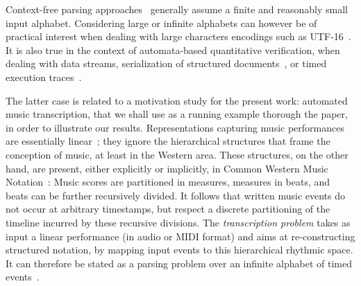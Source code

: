 
Context-free parsing approaches~\cite{GruneJacobs08parsing}
generally assume a finite and reasonably small input alphabet. %
Considering large or infinite alphabets can however be of
practical interest when dealing with large characters encodings such as UTF-16~\cite{dAntoni21CACM}.
It is also true in the context of automata-based quantitative verification,  %
\eg when dealing with data streams, 
serialization of structured documents~\cite{Segoufin06csl,NevenSchwentickVianu04FSMinfinite},
or timed execution traces~\cite{Bouyer03algebraic}.


The latter case is related to a motivation study for the present work:
automated music transcription, 
that we shall use as a running example
thorough the paper, in order to illustrate our results.
%
Representations capturing music performances
are essentially linear~\cite{Selfridge-Field97beyondMIDI};
they ignore the hierarchical structures that frame the
conception of music, at least in the Western area. 
These structures, on the other hand, are present, either explicitly  or implicitly,
in Common Western Music Notation~\cite{Gould11Notation}:
Music scores are partitioned in measures,
measures in beats, and beats can be further recursively divided.
It follows that written music events do not occur at arbitrary timestamps,
but respect a discrete partitioning of the timeline incurred by
these recursive divisions.
The \emph{transcription problem} takes
as input a linear performance (in audio or MIDI format) 
and aims at re-constructing structured notation, 
by mapping input events to this hierarchical rhythmic space.
It can therefore be stated as a parsing problem
over an infinite alphabet of timed events~\cite{foscarin:hal-01988990}.

